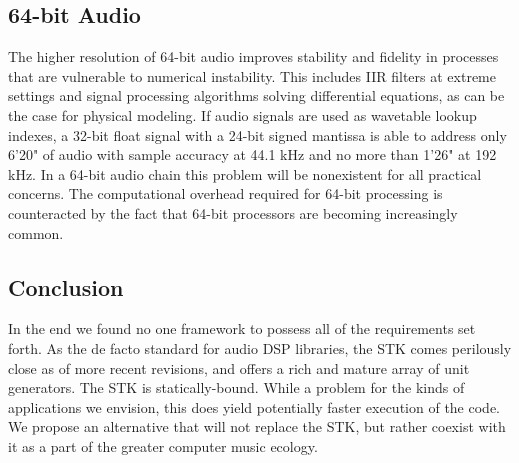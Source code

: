 \documentclass[twoside,10pt]{article}
\begin{document}


\subsection{64-bit Audio} %

The higher resolution of 64-bit audio improves stability and fidelity in processes that are vulnerable to numerical instability.  This includes IIR filters at extreme settings and signal processing algorithms solving differential equations, as can be the case for physical modeling.  If audio signals are used as wavetable lookup indexes, a 32-bit float signal with a 24-bit signed mantissa is able to address only 6'20" of audio with sample accuracy at 44.1 kHz and no more than 1'26" at 192 kHz. In a 64-bit audio chain this problem will be nonexistent for all practical concerns. The computational overhead required for 64-bit processing is counteracted by the fact that 64-bit processors are becoming increasingly common.



\subsection{Conclusion} %

In the end we found no one framework to possess all of the requirements set forth.  As the de facto standard for audio DSP libraries, the STK comes perilously close as of more recent revisions\cite{Scavone:2005}, and offers a rich and mature array of unit generators.  The STK is statically-bound.  While a problem for the kinds of applications we envision, this does yield potentially faster execution of the code.  We propose an alternative that will not replace the STK, but rather coexist with it as a part of the greater computer music ecology.

%
%


\end{document}

